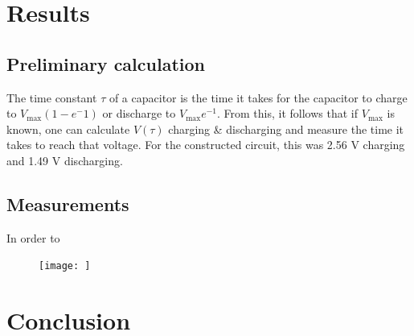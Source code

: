 \documentclass{article}
\begin{document}
\section{Results}
    \subsection{Preliminary calculation}
        The time constant $\tau$ of a capacitor is the time it takes for the capacitor to charge to $V_\mathrm{max}(1-e^-1)$ or discharge to $V_\mathrm{max}e^{-1}$. From this, it follows that if $V_\mathrm{max}$ is known, one can calculate $V(\tau)$ charging \& discharging and measure the time it takes to reach that voltage.
        For the constructed circuit, this was 2.56 V charging and 1.49 V discharging.
    
    \subsection{Measurements}
        In order to

        \begin{figure}
            \begin{minipage}{0.45\textwidth}
                \texttt{[image: ]}
            \end{minipage}
            \begin{minipage}{0.45\textwidth}
                
            \end{minipage}
        \end{figure}

    \begin{table}[h]
        \centering
    \end{table}

\section{Conclusion}
\end{document}
